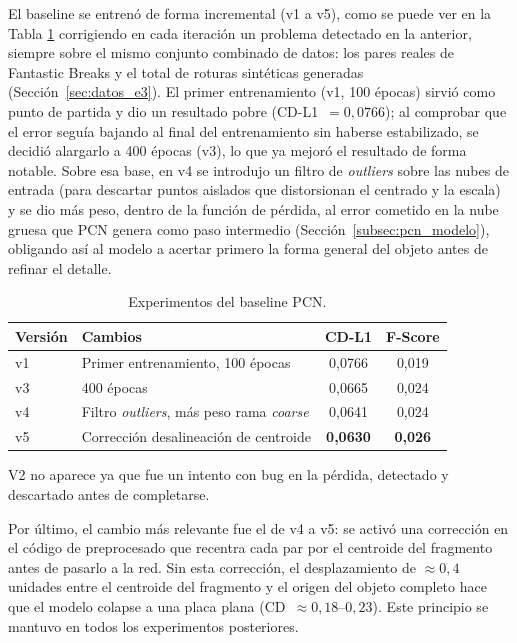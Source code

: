 \documentclass[10pt,a4paper]{report}
\begin{document}
El baseline se entrenó de forma incremental (v1 a v5), como se puede ver en la Tabla \ref{tab:pcn_inic} corrigiendo en cada iteración un
problema detectado en la anterior, siempre sobre el mismo conjunto combinado de datos:
los pares reales de Fantastic Breaks y el total de roturas sintéticas generadas
(Sección~\ref{sec:datos_e3}). El primer entrenamiento (v1, 100 épocas) sirvió como
punto de partida y dio un resultado pobre (CD-L1~$=0{,}0766$); al comprobar que el error
seguía bajando al final del entrenamiento sin haberse estabilizado, se decidió alargarlo
a 400 épocas (v3), lo que ya mejoró el resultado de forma notable. Sobre esa base, en v4
se introdujo un filtro de \textit{outliers} sobre las nubes de entrada (para descartar
puntos aislados que distorsionan el centrado y la escala) y se dio más peso, dentro de
la función de pérdida, al error cometido en la nube gruesa que PCN genera como paso
intermedio (Sección~\ref{subsec:pcn_modelo}), obligando así al modelo a acertar primero
la forma general del objeto antes de refinar el detalle.

\begin{table}[H]
  \centering
  \begin{threeparttable}
  \begin{tabular}{lp{7cm}cc}
    \toprule
    Versión & Cambios & CD-L1 & F-Score \\
    \midrule
    v1 & Primer entrenamiento, 100 épocas                          & 0,0766 & 0,019 \\
    v3 & 400 épocas                                                & 0,0665 & 0,024 \\
    v4 & Filtro \textit{outliers}, más peso rama \textit{coarse}   & 0,0641 & 0,024 \\
    v5 & Corrección desalineación de centroide                    & \textbf{0,0630} & \textbf{0,026} \\
    \bottomrule
  \end{tabular}
  \begin{tablenotes}\footnotesize
    \item V2 no aparece ya que fue un intento con bug en la pérdida, detectado y descartado antes de completarse.
  \end{tablenotes}
  \caption{Experimentos del baseline PCN.}
  \label{tab:pcn_inic}
  \end{threeparttable}
\end{table}

Por último, el cambio más relevante fue el de v4 a v5: se activó una corrección en el código de
preprocesado que recentra cada par por el centroide del fragmento antes de pasarlo a la
red. Sin esta corrección, el desplazamiento de $\approx0{,}4$ unidades entre el
centroide del fragmento y el origen del objeto completo hace que el modelo colapse a
una placa plana (CD~$\approx 0{,}18$--$0{,}23$). Este principio se mantuvo en todos los
experimentos posteriores.
\end{document}
